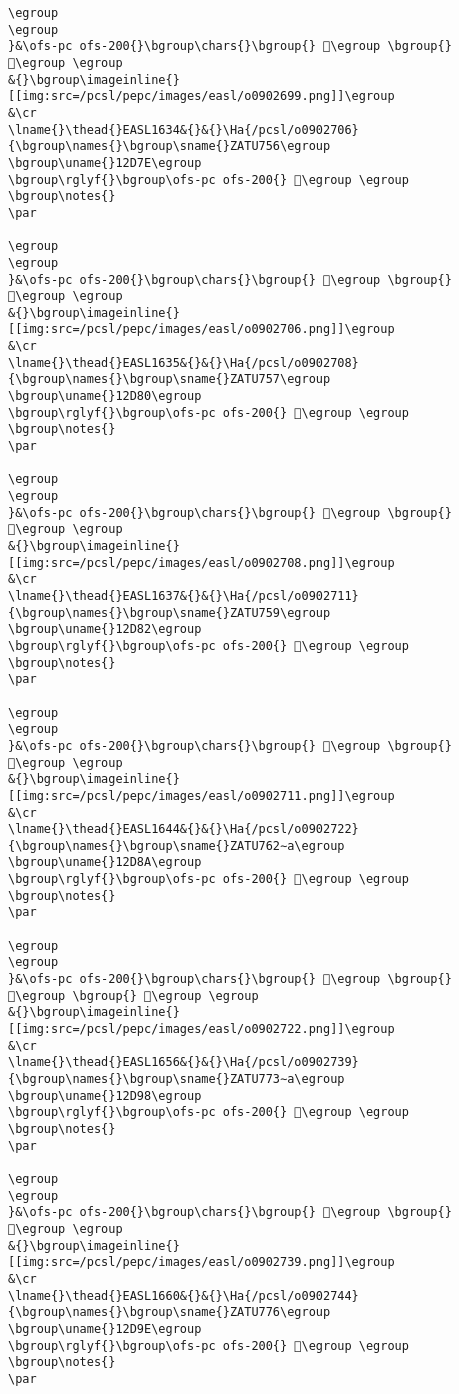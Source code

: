 \begin{verbatim}
\egroup
\egroup
}&\ofs-pc ofs-200{}\bgroup\chars{}\bgroup{} 𒵷\egroup \bgroup{} 𒵸\egroup \egroup
&{}\bgroup\imageinline{}[[img:src=/pcsl/pepc/images/easl/o0902699.png]]\egroup
&\cr
\lname{}\thead{}EASL1634&{}&{}\Ha{/pcsl/o0902706}{\bgroup\names{}\bgroup\sname{}ZATU756\egroup
\bgroup\uname{}12D7E\egroup
\bgroup\rglyf{}\bgroup\ofs-pc ofs-200{} 𒵾\egroup \egroup
\bgroup\notes{}
\par 

\egroup
\egroup
}&\ofs-pc ofs-200{}\bgroup\chars{}\bgroup{} 𒵽\egroup \bgroup{} 𒵾\egroup \egroup
&{}\bgroup\imageinline{}[[img:src=/pcsl/pepc/images/easl/o0902706.png]]\egroup
&\cr
\lname{}\thead{}EASL1635&{}&{}\Ha{/pcsl/o0902708}{\bgroup\names{}\bgroup\sname{}ZATU757\egroup
\bgroup\uname{}12D80\egroup
\bgroup\rglyf{}\bgroup\ofs-pc ofs-200{} 𒶀\egroup \egroup
\bgroup\notes{}
\par 

\egroup
\egroup
}&\ofs-pc ofs-200{}\bgroup\chars{}\bgroup{} 𒵿\egroup \bgroup{} 𒶀\egroup \egroup
&{}\bgroup\imageinline{}[[img:src=/pcsl/pepc/images/easl/o0902708.png]]\egroup
&\cr
\lname{}\thead{}EASL1637&{}&{}\Ha{/pcsl/o0902711}{\bgroup\names{}\bgroup\sname{}ZATU759\egroup
\bgroup\uname{}12D82\egroup
\bgroup\rglyf{}\bgroup\ofs-pc ofs-200{} 𒶂\egroup \egroup
\bgroup\notes{}
\par 

\egroup
\egroup
}&\ofs-pc ofs-200{}\bgroup\chars{}\bgroup{} 𒶈\egroup \bgroup{} 𒶂\egroup \egroup
&{}\bgroup\imageinline{}[[img:src=/pcsl/pepc/images/easl/o0902711.png]]\egroup
&\cr
\lname{}\thead{}EASL1644&{}&{}\Ha{/pcsl/o0902722}{\bgroup\names{}\bgroup\sname{}ZATU762∼a\egroup
\bgroup\uname{}12D8A\egroup
\bgroup\rglyf{}\bgroup\ofs-pc ofs-200{} 𒶊\egroup \egroup
\bgroup\notes{}
\par 

\egroup
\egroup
}&\ofs-pc ofs-200{}\bgroup\chars{}\bgroup{} 𒶍\egroup \bgroup{} 𒶌\egroup \bgroup{} 𒶊\egroup \egroup
&{}\bgroup\imageinline{}[[img:src=/pcsl/pepc/images/easl/o0902722.png]]\egroup
&\cr
\lname{}\thead{}EASL1656&{}&{}\Ha{/pcsl/o0902739}{\bgroup\names{}\bgroup\sname{}ZATU773∼a\egroup
\bgroup\uname{}12D98\egroup
\bgroup\rglyf{}\bgroup\ofs-pc ofs-200{} 𒶘\egroup \egroup
\bgroup\notes{}
\par 

\egroup
\egroup
}&\ofs-pc ofs-200{}\bgroup\chars{}\bgroup{} 𒶘\egroup \bgroup{} 𒶙\egroup \egroup
&{}\bgroup\imageinline{}[[img:src=/pcsl/pepc/images/easl/o0902739.png]]\egroup
&\cr
\lname{}\thead{}EASL1660&{}&{}\Ha{/pcsl/o0902744}{\bgroup\names{}\bgroup\sname{}ZATU776\egroup
\bgroup\uname{}12D9E\egroup
\bgroup\rglyf{}\bgroup\ofs-pc ofs-200{} 𒶞\egroup \egroup
\bgroup\notes{}
\par 


\end{verbatim}
